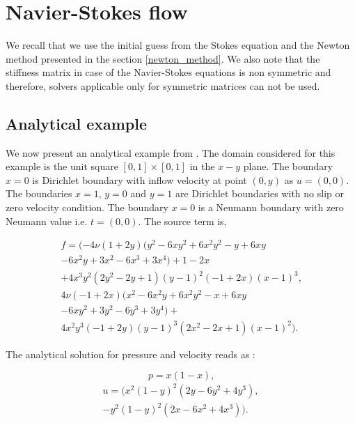 \documentclass[a4paper,twoside,openright]{book}
\begin{document}
\section{Navier-Stokes flow}\label{N-S-ch5}

We recall that we use the initial guess from the Stokes equation and the Newton method presented in the section \ref{newton_method}. We also note that the stiffness matrix in case of the Navier-Stokes equations is non symmetric and therefore, solvers applicable only for symmetric matrices can not be used. 

\subsection{Analytical example}

We now present an analytical example from \cite{Montlaur}. The domain considered for this example is the unit square $[0,1] \times [0,1]$ in the $x-y$ plane. 
The boundary ${x=0}$ is Dirichlet boundary with inflow velocity at point $(0,y)$ as $u = (0, 0)$. The boundaries ${x = 1}$, ${y = 0}$ and ${y = 1}$ are Dirichlet boundaries with no slip or zero velocity condition. The boundary ${x = 0}$ is a Neumann boundary with zero Neumann value i.e. $t = (0, 0)$. The source term is,

\begin{equation}
\begin{split}
f = (-4 \nu (1+2y) (y^2 - 6xy^2 + 6x^2 y^2 - y + 6xy \\ - 6x^2 y + 3x^2 - 6x^3 + 3x^4)+ 1 - 2x \\+ 4x^3 y^2 (2y^2 - 2y + 1)(y - 1)^2 (-1 + 2x)(x - 1)^3 \textrm{,}\\ 4 \nu (-1 + 2x)(x^2 - 6x^2 y + 6x^2 y^2 - x + 6xy \\ - 6xy^2 + 3y^2 - 6y^3 + 3y^4) + \\ 4x^2y^3 (-1+2y)(y-1)^3 (2x^2-2x+1)(x-1)^2) \textrm{.}
\end{split}
\end{equation}
 
The analytical solution for pressure and velocity reads as :

\begin{center}
\begin{equation}
p = x(1 - x) \textrm{,}
\end{equation}
\begin{equation} 
\begin{split}
u = (x^2(1-y)^2(2y-6y^2+4y^3),\\-y^2(1-y)^2(2x-6x^2+4x^3)) \textrm{.}
\end{split}
\end{equation}
\end{center}
\end{document}
